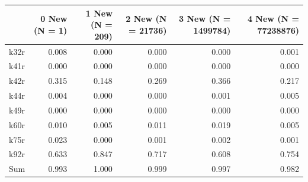 \begin{tabular}{lrrrrr}
\toprule
 & 0 New (N = 1) & 1 New (N = 209) & 2 New (N = 21736) & 3 New (N = 1499784) & 4 New (N = 77238876) \\
\midrule
k32r & 0.008 & 0.000 & 0.000 & 0.000 & 0.001 \\
k41r & 0.000 & 0.000 & 0.000 & 0.000 & 0.000 \\
k42r & 0.315 & 0.148 & 0.269 & 0.366 & 0.217 \\
k44r & 0.004 & 0.000 & 0.000 & 0.001 & 0.005 \\
k49r & 0.000 & 0.000 & 0.000 & 0.000 & 0.000 \\
k60r & 0.010 & 0.005 & 0.011 & 0.019 & 0.005 \\
k75r & 0.023 & 0.000 & 0.001 & 0.002 & 0.001 \\
k92r & 0.633 & 0.847 & 0.717 & 0.608 & 0.754 \\
Sum & 0.993 & 1.000 & 0.999 & 0.997 & 0.982 \\
\bottomrule
\end{tabular}

